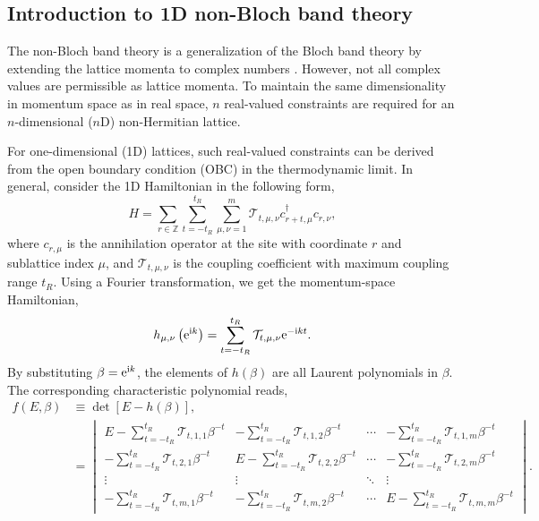 \documentclass[pdflatex,sn-nature, iicol]{sn-jnl}%
\theoremstyle{thmstyleone}%
\theoremstyle{thmstyletwo}%
\theoremstyle{thmstylethree}%
\begin{document}
\subsection{Introduction to 1D non-Bloch band theory}

\label{subsec:GBZ-1D}

The non-Bloch band theory is a generalization of the Bloch band theory
by extending the lattice momenta to complex numbers \cite{yaoEdgeStatesTopological2018,yokomizoNonBlochBandTheory2019,yangNonHermitianBulkBoundaryCorrespondence2020}.
However, not all complex values are permissible as lattice momenta.
To maintain the same dimensionality in momentum space as in real space,
$n$ real-valued constraints are required for an $n$-dimensional
($n$D) non-Hermitian lattice.

For one-dimensional (1D) lattices, such real-valued constraints can
be derived from the open boundary condition (OBC) in the thermodynamic
limit. In general, consider the 1D Hamiltonian in the following form,
\begin{equation}
H=\sum_{r\in\mathbb{Z}}\sum_{t=-t_{R}}^{t_{R}}\sum_{\mu,\nu=1}^{m}\mathcal{T}_{t,\mu,\nu}c_{r+t,\mu}^{\dagger}c_{r,\nu},
\end{equation}
where $c_{r,\mu}$ is the annihilation operator at the site with coordinate
$r$ and sublattice index $\mu$, and $\mathcal{T}_{t,\mu,\nu}$ is
the coupling coefficient with maximum coupling range $t_{R}$. Using
a Fourier transformation, we get the momentum-space Hamiltonian, 
\begin{equation}
h_{\mu,\nu}\left(\mathrm{e}^{\mathrm{i} k}\right)=\sum_{t=-t_{R}}^{t_{R}}\mathcal{T}_{t,\mu,\nu}\mathrm{e}^{-\mathrm{i} kt}.
\end{equation}
By substituting $\beta=\mathrm{e}^{\mathrm{i} k}$, the elements of $h(\beta)$
are all Laurent polynomials in $\beta$. The corresponding characteristic
polynomial reads, 
\begin{align}
f\left(E,\beta\right) & \equiv\det\left[E-h\left(\beta\right)\right],\nonumber \\
 & =\begin{vmatrix}E-\sum\limits_{t=-t_{R}}^{t_{R}}\mathcal{T}_{t,1,1}\beta^{-t} & -\sum\limits_{t=-t_{R}}^{t_{R}}\mathcal{T}_{t,1,2}\beta^{-t} & \cdots & -\sum\limits_{t=-t_{R}}^{t_{R}}\mathcal{T}_{t,1,m}\beta^{-t}\\
-\sum\limits_{t=-t_{R}}^{t_{R}}\mathcal{T}_{t,2,1}\beta^{-t} & E-\sum\limits_{t=-t_{R}}^{t_{R}}\mathcal{T}_{t,2,2}\beta^{-t} & \cdots & -\sum\limits_{t=-t_{R}}^{t_{R}}\mathcal{T}_{t,2,m}\beta^{-t}\\
\vdots & \vdots & \ddots & \vdots\\
-\sum\limits_{t=-t_{R}}^{t_{R}}\mathcal{T}_{t,m,1}\beta^{-t} & -\sum\limits_{t=-t_{R}}^{t_{R}}\mathcal{T}_{t,m,2}\beta^{-t} & \cdots & E-\sum\limits_{t=-t_{R}}^{t_{R}}\mathcal{T}_{t,m,m}\beta^{-t}
\end{vmatrix}.\label{seq:det-1D-ChP}
\end{align}
\end{document}
